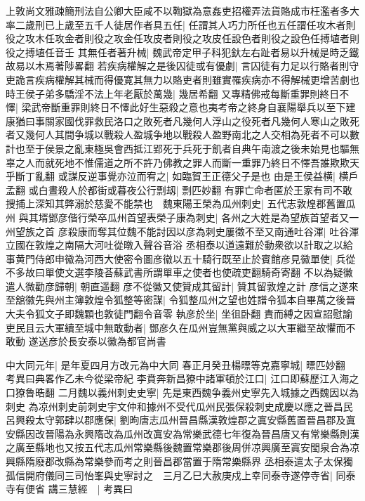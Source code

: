 上敦尚文雅疎簡刑法自公卿大臣咸不以鞫獄為意姦吏招權弄法貨賂成市枉濫者多大率二歲刑已上歲至五千人徒居作者具五任|{
	任謂其人巧力所任也五任謂任攻木者則役之攻木任攻金者則役之攻金任攻皮者則役之攻皮任設色者則役之設色任搏埴者則役之搏埴任音壬}
其無任者著升械|{
	魏武帝定甲子科犯釱左右趾者易以升械是時乏鐵故易以木焉著陟畧翻}
若疾病權解之是後囚徒或有優劇|{
	言囚徒有力足以行賂者則守吏詭言疾病權解其械而得優寛其無力以賂吏者則雖實罹疾病亦不得解械更增苦劇也}
時王侯子弟多驕淫不法上年老厭於萬幾|{
	幾居希翻}
又專精佛戒每斷重罪則終日不懌|{
	梁武帝斷重罪則終日不懌此好生惡殺之意也夷考帝之終身自襄陽舉兵以至下建康猶曰事關家國伐罪救民洛口之敗死者凡幾何人浮山之役死者凡幾何人寒山之敗死者又幾何人其間争城以戰殺人盈城争地以戰殺人盈野南北之人交相為死者不可以數計也至于侯景之亂東極吳會西抵江郢死于兵死于飢者自典午南渡之後未始見也驅無辜之人而就死地不惟儒道之所不許乃佛教之罪人而斷一重罪乃終日不懌吾誰欺欺天乎斷丁亂翻}
或謀反逆事覺亦泣而宥之|{
	如臨賀王正德父子是也}
由是王侯益横|{
	横戶孟翻}
或白晝殺人於都街或暮夜公行剽刼|{
	剽匹妙翻}
有罪亡命者匿於王家有司不敢搜捕上深知其弊溺於慈愛不能禁也　魏東陽王榮為瓜州刺史|{
	五代志敦煌郡舊置瓜州}
與其壻鄧彦偕行榮卒瓜州首望表榮子康為刺史|{
	各州之大姓是為望族首望者又一州望族之首}
彦殺康而奪其位魏不能討因以彦為刺史屢徵不至又南通吐谷渾|{
	吐谷渾立國在敦煌之南隔大河吐從暾入聲谷音浴}
丞相泰以道遠難於動衆欲以計取之以給事黄門侍郎申徽為河西大使密令圖彦徽以五十騎行既至止於賓館彦見徽單使|{
	兵從不多故曰單使文選李陵荅蘇武書所謂單車之使者也使疏吏翻騎奇寄翻}
不以為疑徽遣人微勸彦歸朝|{
	朝直遥翻}
彦不從徽又使贊成其留計|{
	贊其留敦煌之計}
彦信之遂來至舘徽先與州主簿敦煌令狐整等密謀|{
	令狐整瓜州之望也姓譜令狐本自畢萬之後晉大夫令狐文子即魏顆也敦徒門翻令音零}
執彦於坐|{
	坐徂卧翻}
責而縛之因宣詔慰諭吏民且云大軍續至城中無敢動者|{
	鄧彦久在瓜州豈無黨與威之以大軍繼至故懼而不敢動}
遂送彦於長安泰以徽為都官尚書

中大同元年|{
	是年夏四月方改元為中大同}
春正月癸丑楊㬓等克嘉寧城|{
	㬓匹妙翻　考異曰典畧作乙未今從梁帝紀}
李賁奔新昌獠中諸軍頓於江口|{
	江口即蘇歷江入海之口獠魯晧翻}
二月魏以義州刺史史寧|{
	先是東西魏争義州史寧先入城據之西魏因以為刺史}
為凉州刺史前刺史宇文仲和據州不受代瓜州民張保殺刺史成慶以應之晉昌民呂興殺太守郭肆以郡應保|{
	劉昫唐志瓜州晉昌縣漢敦煌郡之寘安縣舊置晉昌郡及寘安縣因改晉陽為永興隋改為瓜州改寘安為常樂武德七年復為晉昌唐又有常樂縣則漢之廣至縣地也又按五代志瓜州常樂縣後魏置常樂郡後周併凉興廣至寘安閠泉合為凉興縣隋廢郡改縣為常樂參而考之則晉昌郡當置于隋常樂縣界}
丞相泰遣太子太保獨孤信開府儀同三司怡峯與史寧討之　三月乙巳大赦庚戍上幸同泰寺遂停寺省|{
	同泰寺有便省}
講三慧經　|{
	考異曰}


